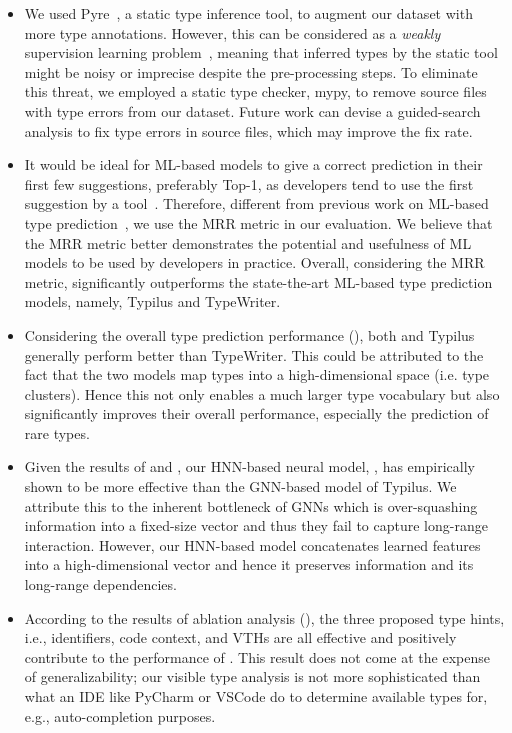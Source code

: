 \begin{itemize}
	\item We used Pyre~\cite{pyre}, a static type inference tool, to augment our dataset with more type annotations. However, this can be considered as a \emph{weakly} supervision learning problem~\cite{zhou2018brief}, meaning that inferred types by the static tool might be noisy or imprecise despite the pre-processing steps. To eliminate this threat, we employed a static type checker, mypy, to remove source files with type errors from our dataset. Future work can devise a guided-search analysis to fix type errors in source files, which may improve the fix rate.
	
	\item It would be ideal for ML-based models to give a correct prediction in their first few suggestions, preferably Top-1, as developers tend to use the first suggestion by a tool~\cite{parnin2011automated}. Therefore, different from previous work on ML-based type prediction~\cite{pradel2019typewriter, allamanis2020typilus}, we use the MRR metric in our evaluation. We believe that the MRR metric better demonstrates the potential and usefulness of ML models to be used by developers in practice. Overall, considering the MRR metric, \name significantly outperforms the state-the-art ML-based type prediction models, namely, Typilus and TypeWriter.
	
	\item Considering the overall type prediction performance (), both \name and Typilus generally perform better than TypeWriter. 
	This could be attributed to the fact that the two models map types into a
	high-dimensional space (i.e. type clusters). Hence this not only enables a much
	larger type vocabulary but also significantly improves their overall performance, especially the prediction
	of rare types.
	
	\item Given the results of  and , our HNN-based neural model, \name, has empirically shown to be more effective than the GNN-based model of Typilus. We attribute this to the inherent bottleneck of GNNs which is over-squashing information into a fixed-size vector \cite{alon2020bottleneck} and thus they fail to capture long-range interaction. However, our HNN-based model concatenates learned features into a high-dimensional vector and hence it preserves information and its long-range dependencies.
	
	\item According to the results of ablation analysis (), the three
	proposed type hints, i.e., identifiers, code context, and VTHs are
	all effective and positively contribute to the performance of \name. This result does not come
	at the expense of generalizability; our visible type analysis is not more
	sophisticated than what an IDE like PyCharm or VSCode do to determine
	available types for, e.g., auto-completion purposes.
	

\end{itemize}
